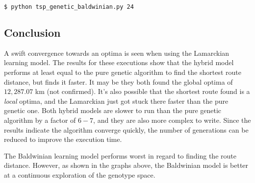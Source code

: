 \documentclass{article}
\begin{document}
\begin{verbatim}
$ python tsp_genetic_baldwinian.py 24
\end{verbatim}

\subsection*{Conclusion}

A swift convergence towards an optima is seen when using the Lamarckian learning model. The results for these executions show that the hybrid model performs at least equal to the pure genetic algorithm to find the shortest route distance, but finds it faster. It may be they both found the global optima of $12,287.07$ km (not confirmed). It's also possible that the shortest route found is a \textit{local} optima, and the Lamarckian just got stuck there faster than the pure genetic one. Both hybrid models are slower to run than the pure genetic algorithm by a factor of $6-7$, and they are also more complex to write. Since the results indicate the algorithm converge quickly, the number of generations can be reduced to improve the execution time.

The Baldwinian learning model performs worst in regard to finding the route distance. However, as shown in the graphs above, the Baldwinian model is better at a continuous exploration of the genotype space.
\end{document}
